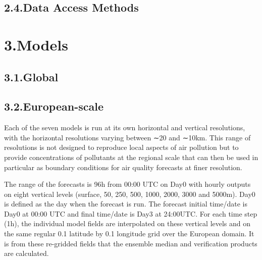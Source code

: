 \documentclass[9pt]{report}
\begin{document}
\subsection{2.4.\hspace*{0.5em}Data Access Methods}\label{sec-data-access-methods}%

\section{3.\hspace*{0.5em}Models}\label{sec-models}%

\subsection{3.1.\hspace*{0.5em}Global}\label{sec-global}%

\subsection{3.2.\hspace*{0.5em}European-scale}\label{sec-european-scale}%

\noindent{}Each of the seven models is run at its own horizontal and vertical resolutions, with the horizontal resolutions varying between ∼20 and ∼10km. 
This range of resolutions is not designed to reproduce local aspects of air pollution but to provide concentrations of pollutants at the regional scale that can then be used in particular as boundary conditions for air quality forecasts at finer resolution.%

The range of the forecasts is 96h from 00:00 UTC on Day0 with hourly outputs on eight vertical levels (surface, 50, 250, 500, 1000, 2000, 3000 and 5000m). 
Day0 is defined as the day when the forecast is run. 
The forecast initial time/date is Day0 at 00:00 UTC and final time/date is Day3 at 24:00UTC. 
For each time step (1h), the individual model fields are interpolated on these vertical levels and on the same regular 0.1\textdegree{} latitude by 0.1\textdegree{} longitude grid over the European domain. 
It is from these re-gridded fields that the ensemble median and verification products are calculated.%
\end{document}
